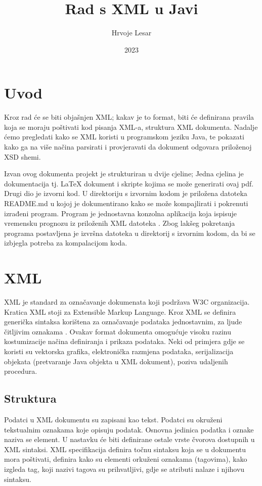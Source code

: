 \documentclass{foi}
\title{Rad s XML u Javi}
\author{Hrvoje Lesar}
\date{2023}
\begin{document}
\maketitle

\tableofcontents

\pagestyle{plain}

\chapter{Uvod}
Kroz rad će se biti objašnjen XML; kakav je to format, biti će definirana pravila koja
se moraju poštivati kod pisanja XML-a, struktura XML dokumenta. Nadalje ćemo pregledati
kako se XML koristi u programskom jeziku Java, te pokazati kako ga na više načina
parsirati i provjeravati da dokument odgovara priloženoj XSD shemi.

Izvan ovog dokumenta projekt je strukturiran u dvije cjeline; Jedna cjelina je
dokumentacija tj. LaTeX dokument i skripte kojima se može generirati ovaj pdf.
Drugi dio je izvorni kod. U direktoriju s izvornim kodom je priložena datoteka
README.md u kojoj je dokumentirano kako se može kompajlirati i pokrenuti izrađeni
program. Program je jednostavna konzolna aplikacija koja ispisuje vremensku prognozu
iz priloženih XML datoteka \cite{dhmz}. Zbog lakšeg pokretanja programa postavljena je
izvršna datoteka u direktorij s izvornim kodom, da bi se izbjegla potreba za kompalacijom koda.


\chapter{XML}
XML je standard za označavanje dokumenata koji podržava W3C organizacija.
Kratica XML stoji za Extensible Markup Language. Kroz XML se definira generička
sintaksa korištena za označavanje podataka jednostavnim, za ljude čitljivim oznakama \cite{xml_in_a_nutshell}.
Ovakav format dokumenta omogućuje visoku razinu kostumizacije načina definiranja
i prikaza podataka. Neki od primjera gdje se koristi su vektorska grafika,
elektronička razmjena podataka, serijalizacija objekata (pretvaranje Java objekta u XML dokument),
poziva udaljenih procedura.

\section{Struktura}
Podatci u XML dokumentu su zapisani kao tekst. Podatci su okruženi tekstualnim oznakama
koje opisuju podatak. Osnovna jedinica podatka i oznake naziva se element. U nastavku će
biti definirane ostale vrste čvorova dostupnih u XML sintaksi. XML specifikacija definira
točnu sintaksu koja se u dokumentu mora poštivati, definira kako su elementi orkuženi
oznakama (tagovima), kako izgleda tag, koji nazivi tagova su prihvatljivi, gdje se
atributi nalaze i njihovu sintaksu.
\end{document}
